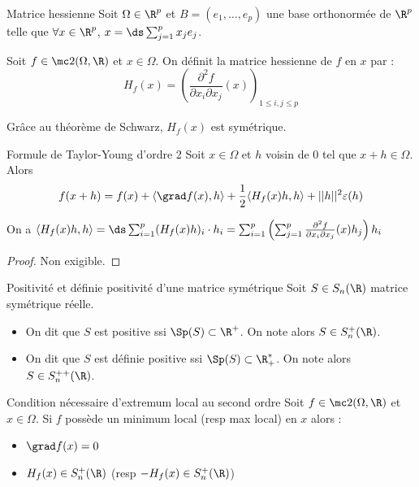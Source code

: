 \begin{definition}{Matrice hessienne}{}
    Soit $\Omega \in \R^p$ et $B = (e_1, \ldots, e_p)$ une base orthonormée de $\R^p$
    telle que $\forall x \in \R^p$, $x = \ds \sum_{j = 1}^{p } x_j e_j$.

    Soit $f \in \mc 2(\Omega, \R)$ et $x \in \Omega$. On définit la matrice hessienne
    de $f$ en $x$ par : 
    $$H_f(x) = \left( \frac{\partial^2 f}{\partial x_i \partial x_j} (x) \right)_{1 \leqslant i, j \leqslant p}$$

    Grâce au théorème de Schwarz, $H_f(x)$ est symétrique.
\end{definition}

\begin{proposition}{Formule de Taylor-Young d'ordre 2}{}
    Soit $x \in \Omega$ et $h$ voisin de $0$ tel que $x + h \in \Omega$. Alors 
    $$f(x + h) = f(x) + \langle \grad f(x), h \rangle + \frac 1 2 \langle H_f(x) h, h \rangle + ||h||^2 \varepsilon(h) $$
\end{proposition}

\begin{remarque}
    On a $\langle H_f(x) h, h \rangle = \ds \sum_{i = 1 }^{p } (H_f(x) h)_i \cdot h_i = \sum_{i = 1}^{p } \left( \sum_{j = 1}^{p } \frac{\partial^2 f}{\partial x_i \partial x_j} (x) h_j \right) h_i$
\end{remarque}

\begin{proof}
    Non exigible. 
\end{proof}

\begin{definition}{Positivité et définie positivité d'une matrice symétrique}{}
    Soit $S \in S_n(\R)$ matrice symétrique réelle. 
    \begin{itemize}
        \item On dit que $S$ est positive ssi $\Sp (S) \subset \R^+$. On note alors $S \in S_n^+(\R)$. 
        \item On dit que $S$ est définie positive ssi $\Sp(S) \subset \R_+^*$. On note alors $S \in S_n^{++}(\R)$.
    \end{itemize}
\end{definition}

\begin{theoreme}{Condition nécessaire d'extremum local au second ordre}{}
    Soit $f \in \mc 2 (\Omega, \R)$ et $x \in \Omega$. Si $f$ possède un minimum local
    (resp max local) en $x$ alors : 
    \begin{itemize}
        \item $\grad f (x) = 0$
        \item $H_f(x) \in S_n^+(\R)$ (resp $-H_f(x) \in S_n^+(\R)$) 
    \end{itemize}
\end{theoreme}

